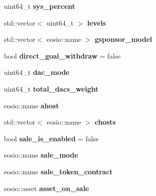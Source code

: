 \begin{DoxyCompactItemize}
\mbox{\label{structhosts_ad10dbf7c3e730b8b2d13045d5068062f}} 
uint64\+\_\+t {\bfseries sys\+\_\+percent}
\item 
\mbox{\label{structhosts_abdbbf47c6df55db5df5c85a4080bc219}} 
std\+::vector$<$ uint64\+\_\+t $>$ {\bfseries levels}
\item 
\mbox{\label{structhosts_a254c752856c4b6443a3f45849a84f466}} 
std\+::vector$<$ eosio\+::name $>$ {\bfseries gsponsor\+\_\+model}
\item 
\mbox{\label{structhosts_abb50503adb4981cb11ebe099e9f024c3}} 
bool {\bfseries direct\+\_\+goal\+\_\+withdraw} = false
\item 
\mbox{\label{structhosts_a93241a9165b6e6d37b12ffc0b56a2a00}} 
uint64\+\_\+t {\bfseries dac\+\_\+mode}
\item 
\mbox{\label{structhosts_aef8c1f7d03f391631abe95bf86ac1aa5}} 
uint64\+\_\+t {\bfseries total\+\_\+dacs\+\_\+weight}
\item 
\mbox{\label{structhosts_a0afc2e8194f998c280b9a0f7ed373a48}} 
eosio\+::name {\bfseries ahost}
\item 
\mbox{\label{structhosts_a9f5f508a3aa947262ac5d8891f197bef}} 
std\+::vector$<$ eosio\+::name $>$ {\bfseries chosts}
\item 
\mbox{\label{structhosts_ae1af9662a7c4c35142db2901d72d393f}} 
bool {\bfseries sale\+\_\+is\+\_\+enabled} = false
\item 
\mbox{\label{structhosts_a52683be3d7dd87b020ad2153b66d3579}} 
eosio\+::name {\bfseries sale\+\_\+mode}
\item 
\mbox{\label{structhosts_a1239eb9e569541798a8f1365ee544b30}} 
eosio\+::name {\bfseries sale\+\_\+token\+\_\+contract}
\item 
\mbox{\label{structhosts_a924bf2601605313ba15140160aa92db3}} 
eosio\+::asset {\bfseries asset\+\_\+on\+\_\+sale}
\item 

\end{DoxyCompactItemize}
